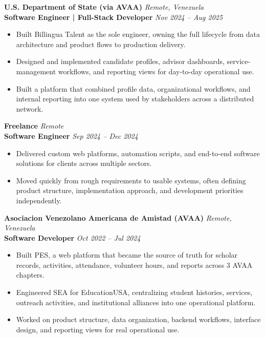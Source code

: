 \documentclass[11pt]{article}
\begin{document}
\vspace{10pt}
\textbf{U.S. Department of State (via AVAA)} \hfill \textit{Remote, Venezuela} \\
\textbf{Software Engineer | Full-Stack Developer} \hfill \textit{Nov 2024 -- Aug 2025}
\begin{itemize}
    \item Built Billingua Talent as the sole engineer, owning the full lifecycle from data architecture and product flows to production delivery.
    \item Designed and implemented candidate profiles, advisor dashboards, service-management workflows, and reporting views for day-to-day operational use.
    \item Built a platform that combined profile data, organizational workflows, and internal reporting into one system used by stakeholders across a distributed network.
\end{itemize}
\vspace{10pt}
\textbf{Freelance} \hfill \textit{Remote} \\
\textbf{Software Engineer} \hfill \textit{Sep 2024 -- Dec 2024}
\begin{itemize}
    \item Delivered custom web platforms, automation scripts, and end-to-end software solutions for clients across multiple sectors.
    \item Moved quickly from rough requirements to usable systems, often defining product structure, implementation approach, and development priorities independently.
\end{itemize}
\vspace{10pt}
\textbf{Asociacion Venezolano Americana de Amistad (AVAA)} \hfill \textit{Remote, Venezuela} \\
\textbf{Software Developer} \hfill \textit{Oct 2022 -- Jul 2024}
\begin{itemize}
    \item Built PES, a web platform that became the source of truth for scholar records, activities, attendance, volunteer hours, and reports across 3 AVAA chapters.
    \item Engineered SEA for EducationUSA, centralizing student histories, services, outreach activities, and institutional alliances into one operational platform.
    \item Worked on product structure, data organization, backend workflows, interface design, and reporting views for real operational use.
\end{itemize}
\end{document}
